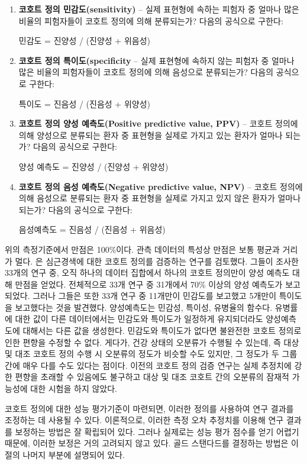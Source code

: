\documentclass[11pt]{book}
\theoremstyle{definition}
\theoremstyle{definition}
\theoremstyle{definition}
\theoremstyle{remark}
\begin{document}
\begin{enumerate}
\def\labelenumi{\arabic{enumi}.}
\item
  \textbf{코호트 정의 민감도(sensitivity)} -- 실제 표현형에 속하는
  피험자 중 얼마나 많은 비율의 피험자들이 코호트 정의에 의해 분류되는가?
  다음의 공식으로 구한다:

  민감도 = 진양성 / (진양성 + 위음성)
\item
  \textbf{코호트 정의 특이도(specificity} -- 실제 표현형에 속하지 않는
  피험자 중 얼마나 많은 비율의 피험자들이 코호트 정의에 의해 음성으로
  분류되는가? 다음의 공식으로 구한다:

  특이도 = 진음성 / (진음성 + 위양성)
\item
  \textbf{코호트 정의 양성 예측도(Positive predictive value, PPV)} --
  코호트 정의에 의해 양성으로 분류되는 환자 중 표현형을 실제로 가지고
  있는 환자가 얼마나 되는가? 다음의 공식으로 구한다:

  양성 예측도 = 진양성 / (진양성 + 위양성)
\item
  \textbf{코호트 정의 음성 예측도(Negative predictive value, NPV)} --
  코호트 정의에 의해 음성으로 분류되는 환자 중 표현형을 실제로 가지고
  있지 않은 환자가 얼마나 되는가? 다음의 공식으로 구한다:

  음성예측도 = 진음성 / (진음성 + 위음성)
\end{enumerate}

위의 측정기준에서 만점은 100\%이다. 관측 데이터의 특성상 만점은 보통
평균과 거리가 멀다. \citet{Rubbo2015phenotypes} 은 심근경색에 대한
코호트 정의를 검증하는 연구를 검토했다. 그들이 조사한 33개의 연구 중,
오직 하나의 데이터 집합에서 하나의 코호트 정의만이 양성 예측도 대해
만점을 얻었다. 전체적으로 33개 연구 중 31개에서 70\% 이상의 양성
예측도가 보고되었다. 그러나 그들은 또한 33개 연구 중 11개만이 민감도를
보고했고 5개만이 특이도을 보고했다는 것을 발견했다. 양성예측도는 민감성,
특이성, 유병율의 함수다. 유병률에 대한 값이 다른 데이터에서는 민감도와
특이도가 일정하게 유지되더라도 양성예측도에 대해서는 다른 값을 생성한다.
민감도와 특이도가 없다면 불완전한 코호트 정의로 인한 편향을 수정할 수
없다. 게다가, 건강 상태의 오분류가 수행될 수 있는데, 즉 대상 및 대조
코호트 정의 수행 시 오분류의 정도가 비슷할 수도 있지만, 그 정도가 두
그룹 간에 매우 다를 수도 있다는 점이다. 이전의 코호트 정의 검증 연구는
실제 추정치에 강한 편향을 초래할 수 있음에도 불구하고 대상 및 대조
코호트 간의 오분류의 잠재적 가능성에 대한 시험을 하지 않았다.

코호트 정의에 대한 성능 평가기준이 마련되면, 이러한 정의를 사용하여 연구
결과를 조정하는 데 사용될 수 있다. 이론적으로, 이러한 측정 오차 추정치를
이용해 연구 결과를 보정하는 방법은 잘 확립되어 있다. 그러나 실제로는
성능 평가 점수를 얻기 어렵기 때문에, 이러한 보정은 거의 고려되지 않고
있다. 골드 스탠다드를 결정하는 방법은 이 절의 나머지 부분에 설명되어
있다.
\end{document}
